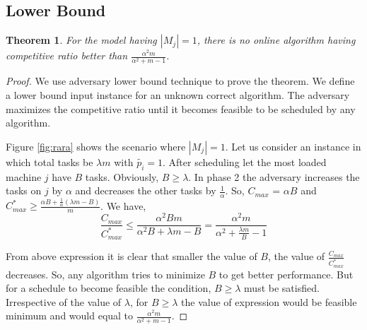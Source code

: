 \documentclass[10pt, conference, compsocconf]{IEEEtran}
\newtheorem{theorem}{Theorem}[section]
\begin{document}
                                                                                                                                                                                                                                                                                                           
\subsection{Lower Bound}

\begin{theorem}
For the model having $|M_j| = 1$, there is no online algorithm having competitive ratio better than  $\frac{\alpha^{2}m }{\alpha^{2} + m-1}$.
\end{theorem} 
\begin{proof}
We use adversary lower bound technique to prove the theorem. We define a lower bound input instance for an unknown correct algorithm. The adversary maximizes the competitive ratio until it becomes feasible to be scheduled by any algorithm.
 
Figure \ref{fig:rara} shows the scenario where $|M_j|=1$.  Let us consider an instance in which total tasks be $\lambda m$ with $\tilde{p_i}=1$. After scheduling let the most loaded machine $j$ have $B$ tasks. Obviously, $B \geq \lambda$. In phase 2 the adversary  increases the tasks on $j$ by $\alpha$ and decreases the other tasks by $\frac{1}{\alpha}$. So, $ C_{max}$ = $\alpha B$ and ${C^{*}_{max}}\geq \frac{\alpha B + \frac{1}{\alpha }  (\lambda  m - B) }{m}$. We have,  
 \begin{equation}\nonumber
\frac{C_{max}}{C^{*}_{max}}\leq \frac{\alpha^{2} B m }{\alpha^{2} B + \lambda m - B}=\frac{\alpha^{2}  m }{\alpha^{2}  + \frac{\lambda m}{B}  - 1}
 \end{equation} 
 
  From above expression it is clear that smaller the value of $B$, the value of $\frac{C_{max}}{C^{*}_{max}}$ decreases. So, any algorithm
  tries to minimize $B$ to get better performance.  But for a schedule to become feasible the condition, $B \geq \lambda$ must  be satisfied. Irrespective of the value of $\lambda$, for $ B \geq \lambda $ the value of expression would be feasible minimum and would equal to   $\frac{\alpha^{2}m }{\alpha^{2} + m-1}$.
\end{proof}    
  
\end{document}

